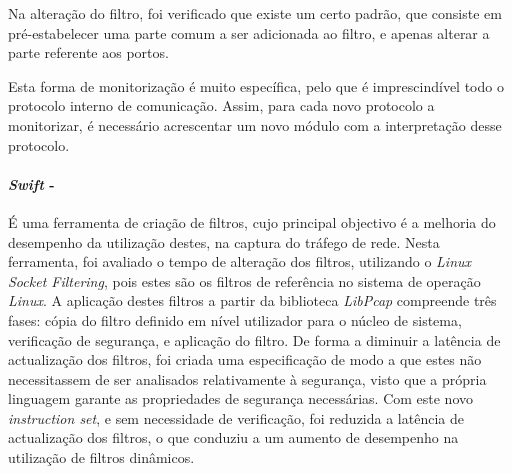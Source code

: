 Na alteração do filtro, foi verificado que existe um certo padrão, que consiste em pré-estabelecer uma parte comum a ser adicionada ao filtro, e apenas alterar a parte referente aos portos.

Esta forma de monitorização é muito específica, pelo que é imprescindível todo o protocolo interno de comunicação.
Assim, para cada novo protocolo a monitorizar, é necessário acrescentar um novo módulo com a interpretação desse protocolo.


\paragraph*{\textit{Swift} - }
É uma ferramenta de criação de filtros, cujo principal objectivo é a melhoria do desempenho da utilização destes, na captura do tráfego de rede.
Nesta ferramenta, foi avaliado o tempo de alteração dos filtros, utilizando o \textit{Linux Socket Filtering}, pois estes são os filtros de referência no sistema de operação \textit{Linux}.
A aplicação destes filtros a partir da biblioteca \textit{LibPcap} compreende três fases: cópia do filtro definido em nível utilizador para o núcleo de sistema, verificação de segurança, e aplicação do filtro.
De forma a diminuir a latência de actualização dos filtros, foi criada uma especificação de modo a que estes não necessitassem de ser analisados relativamente à segurança, visto que a própria linguagem garante as propriedades de segurança necessárias.
Com este novo \textit{instruction set}, e sem necessidade de verificação, foi reduzida a latência de actualização dos filtros, o que conduziu a um aumento de desempenho na utilização de filtros dinâmicos.










